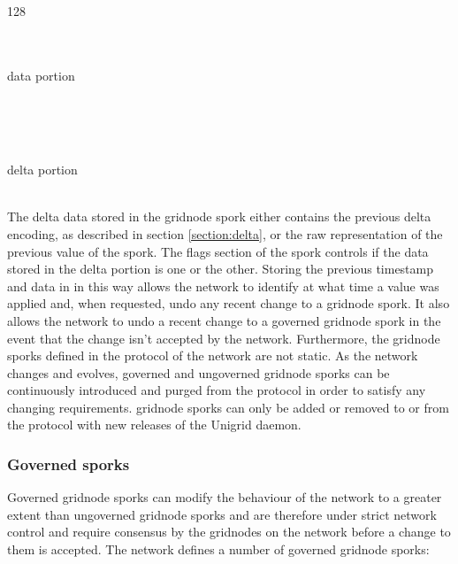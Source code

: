 \documentclass[10pt,a4paper,final]{article}
\newcommand{\colorbitbox}[3]{%
  \rlap{\bitbox{#2}{\color{#1}\rule{\width}{\height}}}%
  \bitbox{#2}{#3}
}
\begin{document}
\bigskip
\begin{noindent}
	\begin{bytefield}[bitwidth=0.27em]{128}
		 \\
		 \\
		\colorbitbox{lightgray}{64}{reserved} \\
		\begin{rightwordgroup}{data portion}
			\colorbitbox{lightgray}{96}{reserved} \\
			 \\
			\skippedwords \\
		\end{rightwordgroup}
		\\
		\begin{rightwordgroup}{delta portion}
			 \\
			\skippedwords \\
			\vspace{0.25cm}
		\end{rightwordgroup}
	\end{bytefield}
\end{noindent}
\noindent The delta data stored in the \gls{gridnode} spork either contains the previous delta encoding, as described in section \ref{section:delta}, or the raw representation of the previous value of the spork. The flags section of the spork controls if the data stored in the delta portion is one or the other. Storing the previous timestamp and data in in this way allows the network to identify at what time a value was applied and, when requested, undo any recent change to a \gls{gridnode} spork. It also allows the network to undo a recent change to a governed \gls{gridnode} spork in the event that the change isn't accepted by the network. Furthermore, the \gls{gridnode} sporks defined in the protocol of the network are not static. As the network changes and evolves, governed and ungoverned \gls{gridnode} sporks can be continuously introduced and purged from the protocol in order to satisfy any changing requirements. \Gls{gridnode} sporks can only be added or removed to or from the protocol with new releases of the Unigrid daemon.

\subsubsection{Governed sporks}
Governed \gls{gridnode} sporks can modify the behaviour of the network to a greater extent than ungoverned \gls{gridnode} sporks and are therefore under strict network control and require consensus by the \glspl{gridnode} on the network before a change to them is accepted. The network defines a number of governed \gls{gridnode} sporks:
\end{document}
